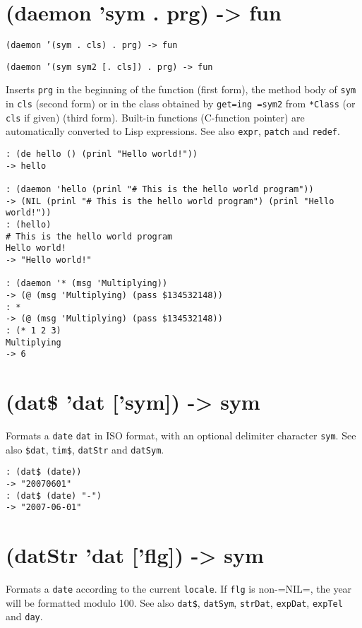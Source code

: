 {{ 
\section{(daemon 'sym . prg) -> fun}
\label{sec-8-1-4-7}


\texttt{(daemon '(sym . cls) . prg) -> fun}

\texttt{(daemon '(sym sym2 [. cls]) . prg) -> fun}

Inserts \texttt{prg} in the beginning of the function (first form), the method
body of \texttt{sym} in \texttt{cls} (second form) or in the class obtained by
\texttt{get=ing =sym2} from \texttt{*Class} (or \texttt{cls} if given) (third form). Built-in
functions (C-function pointer) are automatically converted to Lisp
expressions. See also \texttt{expr}, \texttt{patch} and \texttt{redef}.


\begin{verbatim}
: (de hello () (prinl "Hello world!"))
-> hello

: (daemon 'hello (prinl "# This is the hello world program"))
-> (NIL (prinl "# This is the hello world program") (prinl "Hello world!"))
: (hello)
# This is the hello world program
Hello world!
-> "Hello world!"

: (daemon '* (msg 'Multiplying))
-> (@ (msg 'Multiplying) (pass $134532148))
: *
-> (@ (msg 'Multiplying) (pass $134532148))
: (* 1 2 3)
Multiplying
-> 6
\end{verbatim}

 
\section{(dat\$ 'dat ['sym]) -> sym}
\label{sec-8-1-4-8}


Formats a \texttt{date} \texttt{dat} in ISO format, with an optional delimiter
character \texttt{sym}. See also \texttt{\$dat}, \texttt{tim\$}, \texttt{datStr} and \texttt{datSym}.


\begin{verbatim}
: (dat$ (date))
-> "20070601"
: (dat$ (date) "-")
-> "2007-06-01"
\end{verbatim}

 
\section{(datStr 'dat ['flg]) -> sym}
\label{sec-8-1-4-9}


Formats a \texttt{date} according to the current \texttt{locale}. If \texttt{flg} is
non-=NIL=, the year will be formatted modulo 100. See also \texttt{dat\$},
\texttt{datSym}, \texttt{strDat}, \texttt{expDat}, \texttt{expTel} and \texttt{day}.


}}
